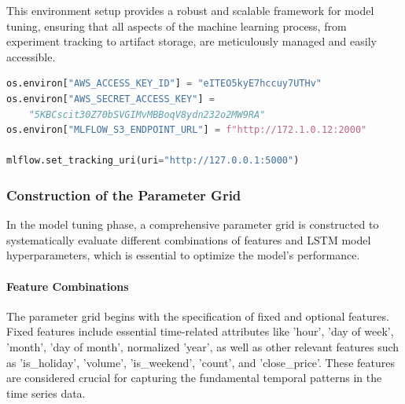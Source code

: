 This environment setup provides a robust and scalable framework for model tuning, ensuring that all aspects of the machine learning process, from experiment tracking to artifact storage, are meticulously managed and easily accessible.\\

\begin{lstlisting}[language=python, caption={Model Tuning Evnironment Setup}, label={lst:model_tuning_environment}]
os.environ["AWS_ACCESS_KEY_ID"] = "eITEO5kyE7hccuy7UTHv"
os.environ["AWS_SECRET_ACCESS_KEY"] = 
    "5KBCscit30Z70bSVGIMvMBBoqV8ydn232o2MW9RA"
os.environ["MLFLOW_S3_ENDPOINT_URL"] = f"http://172.1.0.12:2000"

mlflow.set_tracking_uri(uri="http://127.0.0.1:5000")
\end{lstlisting}

\subsubsection{Construction of the Parameter Grid}

In the model tuning phase, a comprehensive parameter grid is constructed to systematically evaluate different combinations of features and LSTM model hyperparameters, which is essential to optimize the model's performance.

\paragraph{Feature Combinations}
The parameter grid begins with the specification of fixed and optional features. Fixed features include essential time-related attributes like 'hour', 'day of week', 'month', 'day of month', normalized 'year', as well as other relevant features such as 'is\_holiday', 'volume', 'is\_weekend', 'count', and 'close\_price'. These features are considered crucial for capturing the fundamental temporal patterns in the time series data. \\

